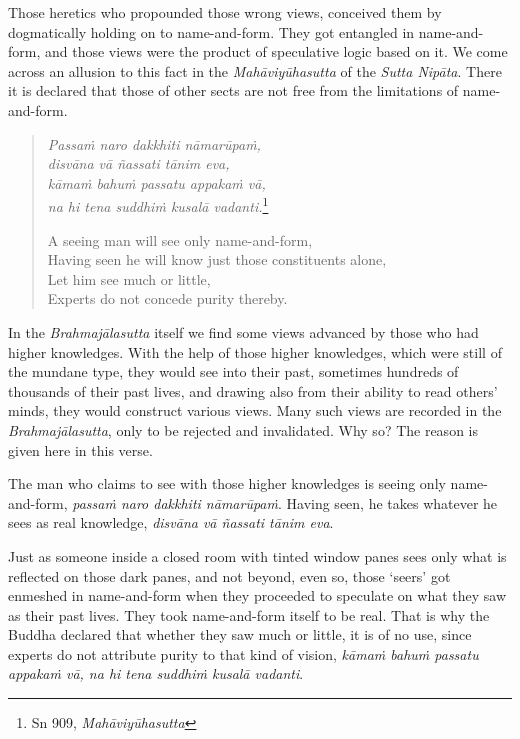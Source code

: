 Those heretics who propounded those wrong views, conceived them by dogmatically holding on to name-and-form. They got entangled in name-and-form, and those views were the product of speculative logic based on it. We come across an allusion to this fact in the \emph{Mahāviyūhasutta} of the \emph{Sutta Nipāta}. There it is declared that those of other sects are not free from the limitations of name-and-form.

\begin{quote}
\emph{Passaṁ naro dakkhiti nāmarūpaṁ,}\\
\emph{disvāna vā ñassati tānim eva,}\\
\emph{kāmaṁ bahuṁ passatu appakaṁ vā,}\\
\emph{na hi tena suddhiṁ kusalā vadanti.}\footnote{Sn 909, \emph{Mahāviyūhasutta}}

A seeing man will see only name-and-form,\\
Having seen he will know just those constituents alone,\\
Let him see much or little,\\
Experts do not concede purity thereby.
\end{quote}

In the \emph{Brahmajālasutta} itself we find some views advanced by those who had higher knowledges. With the help of those higher knowledges, which were still of the mundane type, they would see into their past, sometimes hundreds of thousands of their past lives, and drawing also from their ability to read others' minds, they would construct various views. Many such views are recorded in the \emph{Brahmajālasutta}, only to be rejected and invalidated. Why so? The reason is given here in this verse.

The man who claims to see with those higher knowledges is seeing only name-and-form, \emph{passaṁ naro dakkhiti nāmarūpaṁ}. Having seen, he takes whatever he sees as real knowledge, \emph{disvāna vā ñassati tānim eva}.

Just as someone inside a closed room with tinted window panes sees only what is reflected on those dark panes, and not beyond, even so, those `seers' got enmeshed in name-and-form when they proceeded to speculate on what they saw as their past lives. They took name-and-form itself to be real. That is why the Buddha declared that whether they saw much or little, it is of no use, since experts do not attribute purity to that kind of vision, \emph{kāmaṁ bahuṁ passatu appakaṁ vā, na hi tena suddhiṁ kusalā vadanti}.

